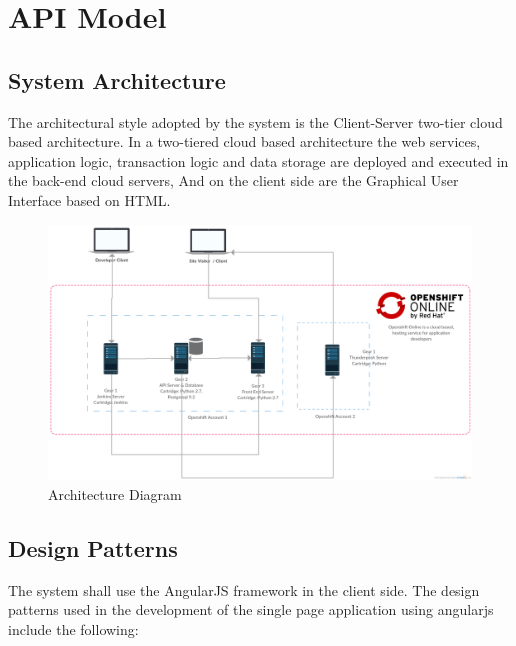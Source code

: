 \documentclass{report}
\begin{document}
\chapter{API Model}
\section{System Architecture}
The architectural style adopted by the system is the Client-Server two-tier cloud based architecture. In a two-tiered cloud based architecture the web services, application logic, transaction logic and data storage are deployed and executed in the back-end cloud servers, And on the client side are the Graphical User Interface based on HTML. 
\begin{figure}[h!]
\includegraphics[width=\linewidth]{Diagrams/TopLevelSystemLevelArchitecture.png}
\caption{Architecture Diagram}
\label{fig:ArchDia}
\end{figure}
\section{Design Patterns}
The system shall use the AngularJS framework in the client side. The design patterns used in the development of the single page application using angularjs include the following: 
\end{document}
